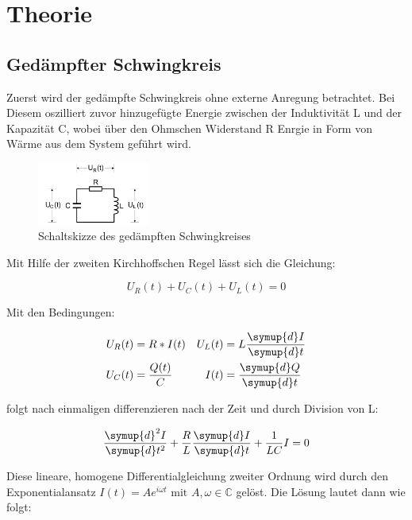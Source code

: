 \section{Theorie}
\label{sec:Theorie}

\subsection{Gedämpfter Schwingkreis}
\label{sec:Theorie_1}

Zuerst wird der gedämpfte Schwingkreis ohne externe Anregung betrachtet. 
Bei Diesem oszilliert zuvor hinzugefügte Energie zwischen der Induktivität L und der Kapazität C,
wobei über den Ohmschen Widerstand R Enrgie in Form von Wärme aus dem System geführt wird.

\begin{figure}
	\centering
    \includegraphics[width=0.33\textwidth]{content/RLC-Kreis.pdf}
	\caption{Schaltskizze des gedämpften Schwingkreises \cite{v354}}
	\label{fig:RLC}
\end{figure}

Mit Hilfe der zweiten Kirchhoffschen Regel lässt sich die Gleichung:

\begin{equation}
    \label{eqn:RLC1}
    U_R(t) + U_C(t)+ U_L(t) = 0
\end{equation}

Mit den Bedingungen:

\begin{align*}
    U_R(t) &= R*I(t) & U_L(t) &= L \frac{\symup{d}I}{\symup{d}t} \\
    U_C(t) &= \frac{Q(t)}{C} & I(t) &= \frac{\symup{d}Q}{\symup{d}t}
\end{align*}

folgt nach einmaligen differenzieren nach der Zeit und durch Division von L:

\begin{equation}
    \label{eqn:RLC_dgl}
    \frac{\symup{d}^{2}I}{\symup{d}t^2} + \frac{R}{L}\frac{\symup{d}I}{\symup{d}t} + \frac{1}{LC}I = 0   
\end{equation}

Diese lineare, homogene Differentialgleichung zweiter Ordnung wird durch den Exponentialansatz 
$I(t) = A e^{i\omega t} \text{ mit } A, \omega \in \mathbb{C}$ gelöst. Die Lösung lautet dann wie folgt:

